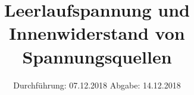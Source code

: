 

\subject{V301}
\title{Leerlaufspannung und Innenwiderstand von Spannungsquellen}
\date{
  Durchführung: 07.12.2018
  \hspace{3em}
  Abgabe: 14.12.2018
}



\maketitle
\thispagestyle{empty}
\tableofcontents
\newpage







\printbibliography{}

